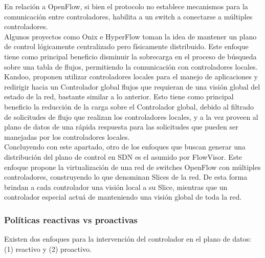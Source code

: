 En relación a OpenFlow, si bien el protocolo no establece mecanismos para la comunicación entre controladores, habilita a un switch a conectarse a múltiples controladores.\\

Algunos proyectos como Onix\cite{koponen2014distributed} e HyperFlow\cite{tootoonchian2010hyperflow} toman la idea de mantener un plano de control lógicamente centralizado pero físicamente distribuido. Este enfoque tiene como principal beneficio disminuir la sobrecarga en el proceso de búsqueda sobre una tabla de flujos, permitiendo la comunicación con controladores locales.\\

Kandoo\cite{hassas2012kandoo}, proponen utilizar controladores locales para el manejo de aplicaciones y redirigir hacia un Controlador global flujos que requieran de una visión global del estado de la red, bastante similar a lo anterior. Esto tiene como principal beneficio la reducción de la carga sobre el Controlador global, debido al filtrado de solicitudes de flujo que realizan los controladores locales, y a la vez proveen al plano de datos de una rápida respuesta para las solicitudes que pueden ser manejadas por los controladores locales.\\

Concluyendo con este apartado, otro de los enfoques que buscan generar una distribución del plano de control en SDN es el asumido por FlowVisor\cite{sherwood2010carving}. Este enfoque propone la virtualización de una red de switches OpenFlow con múltiples controladores, construyendo lo que denominan Slices de la red. De esta forma brindan a cada controlador una visión local a su Slice, mientras que un controlador especial actuá de  manteniendo una visión global de toda la red.

\subsubsection{Políticas reactivas vs proactivas}
Existen dos enfoques para la intervención del controlador en el plano de datos: (1) reactivo y (2) proactivo.

